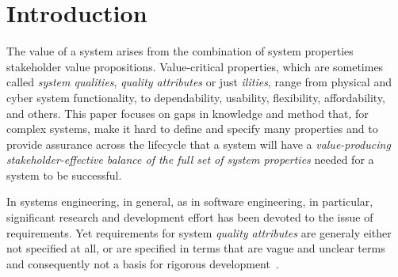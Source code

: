 \documentclass[conference]{IEEEtran}
\begin{document}
\IEEEpeerreviewmaketitle



\section{Introduction}
The value of a system arises from the combination of system properties stakeholder value propositions. Value-critical properties, which are sometimes called {\em system qualities}, {\em quality attributes} or just {\em ilities}, range from physical and cyber system functionality, to dependability, usability, flexibility, affordability, and others. This paper focuses on gaps in knowledge and method that, for complex systems, make it hard to define and specify many properties and to provide assurance across the lifecycle that a system will have a  {\em value-producing stakeholder-effective balance of the full set of system properties} needed for a system to be successful. 

In systems engineering, in general, as in software engineering, in particular, significant research and development effort has been devoted to the issue of requirements. Yet requirements for system {\em quality attributes} are generaly either not specified at all, or are specified in terms that are vague and unclear terms and consequently not a basis for rigorous development~\cite{bosch-isa99}. 
\end{document}
